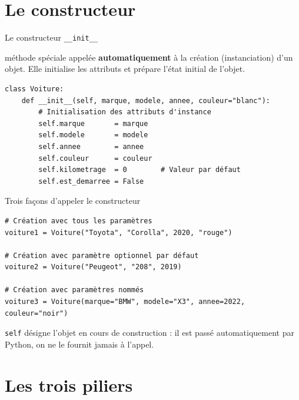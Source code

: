 \documentclass[11pt,aspectratio=169]{beamer}
\newcommand{\py}[1]{\texttt{#1}}
\begin{document}
\section{Le constructeur}

\begin{frame}[fragile]{Le constructeur \py{\_\_init\_\_}}
  \begin{defi}[Constructeur]
    méthode spéciale appelée \textbf{automatiquement} à la création (instanciation)
    d'un objet. Elle initialise les attributs et prépare l'état initial de l'objet.
  \end{defi}
\begin{lstlisting}
class Voiture:
    def __init__(self, marque, modele, annee, couleur="blanc"):
        # Initialisation des attributs d'instance
        self.marque       = marque
        self.modele       = modele
        self.annee        = annee
        self.couleur      = couleur
        self.kilometrage  = 0        # Valeur par défaut
        self.est_demarree = False
\end{lstlisting}
\end{frame}

\begin{frame}[fragile]{Trois façons d'appeler le constructeur}
\begin{lstlisting}
# Création avec tous les paramètres
voiture1 = Voiture("Toyota", "Corolla", 2020, "rouge")

# Création avec paramètre optionnel par défaut
voiture2 = Voiture("Peugeot", "208", 2019)

# Création avec paramètres nommés
voiture3 = Voiture(marque="BMW", modele="X3", annee=2022, couleur="noir")
\end{lstlisting}
  \begin{methode}[À retenir]
    \py{self} désigne l'objet en cours de construction : il est passé
    automatiquement par Python, on ne le fournit jamais à l'appel.
  \end{methode}
\end{frame}

\section{Les trois piliers}
\end{document}
